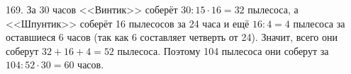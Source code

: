 169. За 30 часов <<Винтик>> соберёт $30:15\cdot16=32$ пылесоса, а <<Шпунтик>> соберёт 16 пылесосов за 24 часа и ещё $16:4=4$ пылесоса за оставшиеся 6 часов (так как 6 составляет четверть от 24). Значит, всего они соберут $32+16+4=52$ пылесоса. Поэтому 104 пылесоса они соберут за $104:52\cdot30=60$ часов.\\
